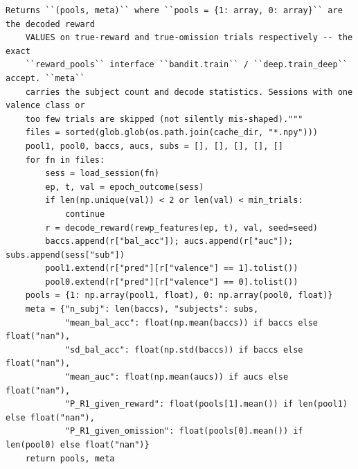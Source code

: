 \begin{lstlisting}[caption={mrl\_trace/dopamine.py},label={lst:siox-src-dopamine}]
    Returns ``(pools, meta)`` where ``pools = {1: array, 0: array}`` are the decoded reward
    VALUES on true-reward and true-omission trials respectively -- the exact
    ``reward_pools`` interface ``bandit.train`` / ``deep.train_deep`` accept. ``meta``
    carries the subject count and decode statistics. Sessions with one valence class or
    too few trials are skipped (not silently mis-shaped)."""
    files = sorted(glob.glob(os.path.join(cache_dir, "*.npy")))
    pool1, pool0, baccs, aucs, subs = [], [], [], [], []
    for fn in files:
        sess = load_session(fn)
        ep, t, val = epoch_outcome(sess)
        if len(np.unique(val)) < 2 or len(val) < min_trials:
            continue
        r = decode_reward(rewp_features(ep, t), val, seed=seed)
        baccs.append(r["bal_acc"]); aucs.append(r["auc"]); subs.append(sess["sub"])
        pool1.extend(r["pred"][r["valence"] == 1].tolist())
        pool0.extend(r["pred"][r["valence"] == 0].tolist())
    pools = {1: np.array(pool1, float), 0: np.array(pool0, float)}
    meta = {"n_subj": len(baccs), "subjects": subs,
            "mean_bal_acc": float(np.mean(baccs)) if baccs else float("nan"),
            "sd_bal_acc": float(np.std(baccs)) if baccs else float("nan"),
            "mean_auc": float(np.mean(aucs)) if aucs else float("nan"),
            "P_R1_given_reward": float(pools[1].mean()) if len(pool1) else float("nan"),
            "P_R1_given_omission": float(pools[0].mean()) if len(pool0) else float("nan")}
    return pools, meta



\end{lstlisting}
